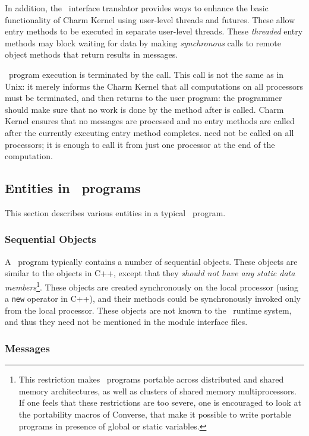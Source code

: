 In addition, the \charmpp\ interface translator provides ways to enhance the
basic functionality of Charm Kernel using user-level threads and futures. These
allow entry methods to be executed in separate user-level threads.  These
 {\em threaded} entry methods may block waiting for data by
making {\em synchronous} calls to remote object methods that return results in
messages.

\charmpp\ program execution is terminated by the 
 call. This call is not the same as in Unix:
it merely informs the Charm Kernel that all computations on all processors must
be terminated, and then returns to the user program: the programmer should make
sure that no work is done by the method after  is called.
Charm Kernel ensures that no messages are processed and no entry methods are
called after the currently executing entry method completes. 
need not be called on all processors; it is enough to call it from just one
processor at the end of the computation.

\subsection{Entities in \charmpp\ programs}

This section describes various entities in a typical \charmpp\ program.

\subsubsection{Sequential Objects}

A \charmpp\ program typically contains a number of sequential objects. These
objects are similar to the objects in C++, except that they {\em should not
have any static data members}\footnote{ This restriction makes \charmpp\
programs portable across distributed and shared memory architectures, as well
as clusters of shared memory multiprocessors. If one feels that these
restrictions are too severe, one is encouraged to look at the portability
macros of Converse, that make it possible to write portable programs in
presence of global or static variables.  }. These objects are created
synchronously on the local processor (using a {\tt new} operator in C++), and
their methods could be synchronously invoked only from the local processor.
These objects are not known to the \charmpp\ runtime system, and
thus they need not be mentioned in the module interface files.

\subsubsection{Messages}

